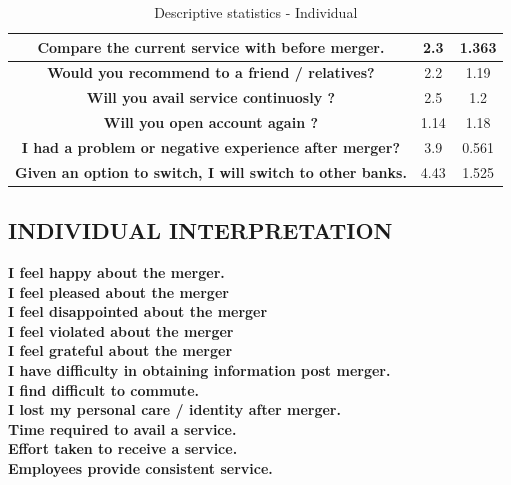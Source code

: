 \documentclass[a4paper, 12pt]{extarticle}
\begin{document}
{\begin{table}[H]
\begin{tabular}{|c|c|c|}
\hline
\textbf{ Compare the current service with before merger.} & 2.3 & 1.363 \\
\hline
\textbf{ Would you recommend to a friend / relatives?} & 2.2 & 1.19 \\
\hline
\textbf{ Will you avail service continuosly ?} & 2.5 & 1.2 \\
\hline
\textbf{ Will you open account again ?} & 1.14 & 1.18 \\
\hline
\textbf{ I had a problem or negative experience after merger?} & 3.9 & 0.561 \\
\hline
\textbf{ Given an option to switch, I will switch to other banks.} & 4.43 & 1.525 \\
\hline
\end{tabular}
\caption{Descriptive statistics - Individual}
\end{table}

\subsection{INDIVIDUAL INTERPRETATION}

\textbf{ I feel happy about the merger.} \\

\textbf{ I feel pleased about the merger} \\

\textbf{ I feel disappointed about the merger } \\

\textbf{ I feel violated about the merger} \\

\textbf{ I feel grateful about the merger}  \\

\textbf{ I have difficulty in obtaining information post merger. } \\

\textbf{ I find difficult to commute.} \\
    
\textbf{ I lost my personal care / identity after merger. }  \\

\textbf{ Time required to avail a service.} \\

\textbf{ Effort taken to receive a service.} \\ 

\textbf{ Employees provide consistent service.} \\  

}
\end{document}

